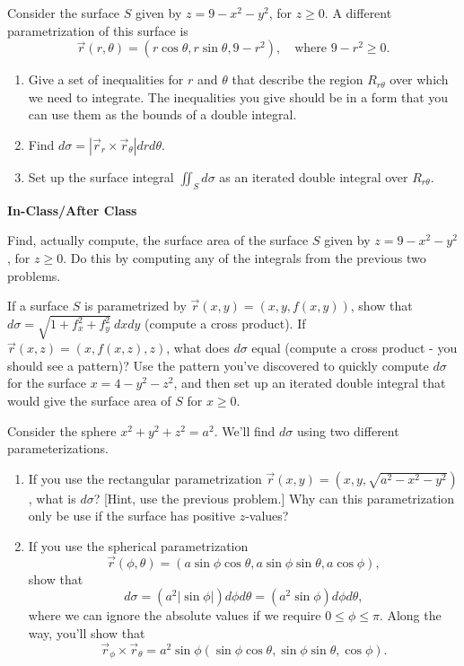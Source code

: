 \begin{problem}
 Consider the surface $S$ given by $z=9-x^2-y^2$, for $z\geq 0$. A different parametrization of this surface is $$\vec r(r,\theta) = (r\cos\theta,r\sin\theta,9-r^2),\quad \text{where } 9-r^2\geq 0.$$ 
\begin{enumerate}
 \item Give a set of inequalities for $r$ and $\theta$ that describe the region $R_{r\theta}$ over which we need to integrate. The inequalities you give should be in a form that you can use them as the bounds of a double integral.
 \item Find $d\sigma = \left|\vec r_r\times \vec r_\theta \right|drd\theta$.
 \item Set up the surface integral $\iint_S d\sigma$ as an iterated double integral over $R_{r\theta}$. 
\end{enumerate}
\end{problem}

\newpage

\Large
\textbf{In-Class/After Class}\\
\normalsize

\begin{problem}
 Find, actually compute, the surface area of the surface $S$ given by $z=9-x^2-y^2$, for $z\geq 0$. Do this by computing any of the integrals from the previous two problems.
\end{problem}

\begin{problem}
 If a surface $S$ is parametrized by $\vec r(x,y) = (x,y,f(x,y))$, show that $d\sigma = \sqrt{1+f_x^2+f_y^2}\ dxdy$ (compute a cross product).  
If $\vec r(x,z) = (x,f(x,z),z)$, what does $d\sigma$ equal (compute a cross product - you should see a pattern)?
Use the pattern you've discovered to quickly compute $d\sigma$ for the surface $x=4-y^2-z^2$, and then set up an iterated double integral that would give the surface area of $S$ for $x\geq 0$. 
\end{problem}


\begin{problem}\label{sphere surface area element}
 Consider the sphere $x^2+y^2+z^2=a^2$.  We'll find $d\sigma$ using two different parameterizations.
 \begin{enumerate}
  \item If you use the rectangular parametrization $\vec r(x,y) = (x,y,\sqrt{a^2-x^2-y^2})$, what is $d\sigma$? [Hint, use the previous problem.] Why can this parametrization only be use if the surface has positive $z$-values?
  \item {} If you use the spherical parametrization $$\vec r(\phi,\theta) = (a\sin\phi\cos\theta,a\sin\phi\sin\theta,a\cos\phi),$$ show that $$d\sigma = (a^2|\sin\phi|)d\phi d\theta= (a^2\sin\phi) d\phi d\theta,$$ where we can ignore the absolute values if we require $0\leq \phi\leq \pi$. Along the way, you'll show that 
$$ \vec r_\phi\times \vec r_\theta = a^2\sin \phi (\sin\phi\cos\theta,\sin\phi\sin\theta,\cos\phi).$$
 \end{enumerate}
\end{problem}


